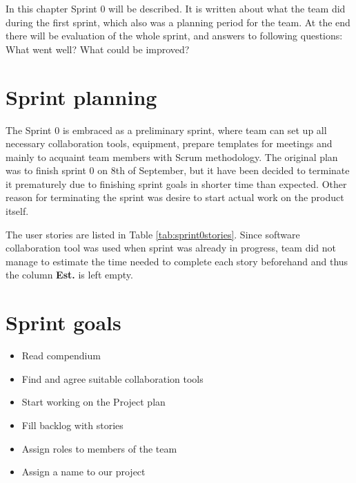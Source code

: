 In this chapter Sprint 0 will be described. It is written about what the team did during the first sprint, which also was a planning period for the team. At the end there will be evaluation of the  whole sprint, and answers to following questions: What went well? What could be improved? 

\section{Sprint planning}
The Sprint 0 is embraced as a preliminary sprint, where team can set up all necessary collaboration tools, equipment, prepare templates for meetings and mainly to acquaint team members with Scrum methodology. The original plan was to finish sprint 0 on 8th of September, but it have been decided to terminate it prematurely due to finishing sprint goals in shorter time than expected. Other reason for terminating the sprint was desire to start actual work on the product itself.

The user stories are listed in Table \ref{tab:sprint0stories}. Since software collaboration tool was used when sprint was already in progress, team did not manage to estimate the time needed to complete each story beforehand and thus the column \textbf{Est.} is left empty.




\section{Sprint goals}
\begin{itemize}
    \item Read compendium
    \item Find and agree suitable collaboration tools
    \item Start working on the Project plan
    \item Fill backlog with stories
    \item Assign roles to members of the team
    \item Assign a name to our project
\end{itemize}


